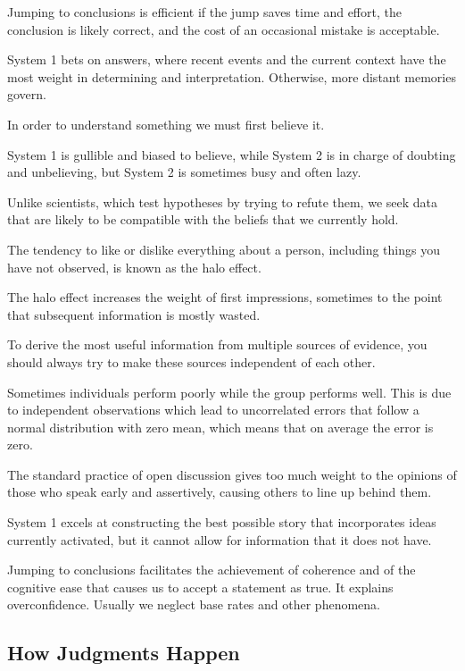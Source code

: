 \bit
\item Jumping to conclusions is efficient if the jump saves time and effort, the conclusion is likely correct, and
the cost of an occasional mistake is acceptable.
\item System 1 bets on answers, where recent events and the current context have the most weight in determining and
interpretation. Otherwise, more distant memories govern.
\item In order to understand something we must first believe it.
\item System 1 is gullible and biased to believe, while System 2 is in charge of doubting and unbelieving, but System
2 is sometimes busy and often lazy.
\item Unlike scientists, which test hypotheses by trying to refute them, we seek data that are likely to be
compatible with the beliefs that we currently hold.
\item The tendency to like or dislike everything about a person, including things you have not observed, is known as
the halo effect.
\item The halo effect increases the weight of first impressions, sometimes to the point that subsequent information
is mostly wasted.
\item To derive the most useful information from multiple sources of evidence, you should always try to make these
sources independent of each other.
\item Sometimes individuals perform poorly while the group performs well. This is due to independent observations
which lead to uncorrelated errors that follow a normal distribution with zero mean, which means that on average the
error is zero.
\item The standard practice of open discussion gives too much weight to the opinions of those who speak early and
assertively, causing others to line up behind them.
\item System 1 excels at constructing the best possible story that incorporates ideas currently activated, but it
cannot allow for information that it does not have.
\item Jumping to conclusions facilitates the achievement of coherence and of the cognitive ease that causes us to
accept a statement as true. It explains overconfidence. Usually we neglect base rates and other phenomena.
\eit

\subsection*{How Judgments Happen}

